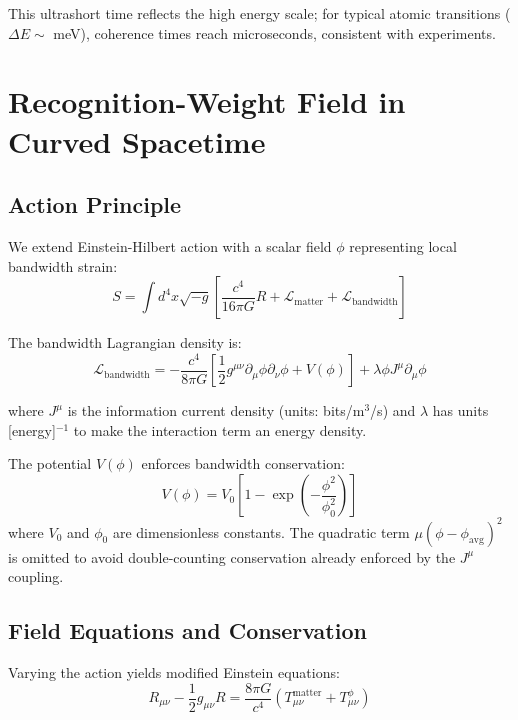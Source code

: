 \documentclass[twocolumn,prd,amsmath,amssymb,aps,superscriptaddress,nofootinbib]{revtex4-2}
\begin{document}
This ultrashort time reflects the high energy scale; for typical atomic transitions ($\Delta E \sim$ meV), coherence times reach microseconds, consistent with experiments.

\section{Recognition-Weight Field in Curved Spacetime}
\label{sec:field}

\subsection{Action Principle}

We extend Einstein-Hilbert action with a scalar field $\phi$ representing local bandwidth strain:
\begin{equation}
S = \int d^4x \sqrt{-g} \left[\frac{c^4}{16\pi G}R + \mathcal{L}_{\text{matter}} + \mathcal{L}_{\text{bandwidth}}\right]
\label{eq:action}
\end{equation}

The bandwidth Lagrangian density is:
\begin{equation}
\mathcal{L}_{\text{bandwidth}} = -\frac{c^4}{8\pi G}\left[\frac{1}{2} g^{\mu\nu} \partial_\mu\phi \partial_\nu\phi + V(\phi)\right] + \lambda\phi J^\mu \partial_\mu\phi
\end{equation}

where $J^\mu$ is the information current density (units: bits/m$^3$/s) and $\lambda$ has units [energy]$^{-1}$ to make the interaction term an energy density.

The potential $V(\phi)$ enforces bandwidth conservation:
\begin{equation}
V(\phi) = V_0\left[1 - \exp\left(-\frac{\phi^2}{\phi_0^2}\right)\right]
\label{eq:potential}
\end{equation}
where $V_0$ and $\phi_0$ are dimensionless constants. The quadratic term $\mu(\phi - \phi_{\text{avg}})^2$ is omitted to avoid double-counting conservation already enforced by the $J^\mu$ coupling.

\subsection{Field Equations and Conservation}

Varying the action yields modified Einstein equations:
\begin{equation}
R_{\mu\nu} - \frac{1}{2}g_{\mu\nu} R = \frac{8\pi G}{c^4}(T_{\mu\nu}^{\text{matter}} + T_{\mu\nu}^\phi)
\label{eq:einstein_modified}
\end{equation}
\end{document}
